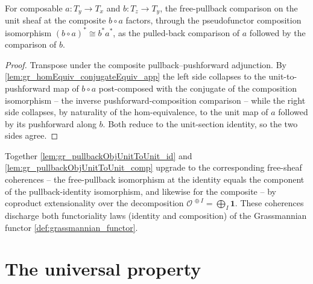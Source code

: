 \begin{lemma}\leanok
  \label{lem:gr_pullbackObjUnitToUnit_comp}
  For composable \(a : T_y \to T_x\) and \(b : T_z \to T_y\), the free-pullback comparison on
  the unit sheaf at the composite \(b \circ a\) factors, through the pseudofunctor composition
  isomorphism \((b\circ a)^{*}\cong b^{*}a^{*}\), as the pulled-back comparison of \(a\)
  followed by the comparison of \(b\).
\end{lemma}
\begin{proof}
  \leanok
  Transpose under the composite pullback--pushforward adjunction. By
  \cref{lem:gr_homEquiv_conjugateEquiv_app} the left side collapses to the unit-to-pushforward
  map of \(b\circ a\) post-composed with the conjugate of the composition isomorphism -- the
  inverse pushforward-composition comparison -- while the right side collapses, by naturality
  of the hom-equivalence, to the unit map of \(a\) followed by its pushforward along \(b\).
  Both reduce to the unit-section identity, so the two sides agree.
\end{proof}


Together \cref{lem:gr_pullbackObjUnitToUnit_id} and \cref{lem:gr_pullbackObjUnitToUnit_comp}
upgrade to the corresponding free-sheaf coherences -- the free-pullback isomorphism at the
identity equals the component of the pullback-identity isomorphism, and likewise for the
composite -- by coproduct extensionality over the decomposition
\(\mathcal{O}^{\,\oplus I} = \bigoplus_I \mathbf 1\). These coherences discharge both
functoriality laws (identity and composition) of the Grassmannian
functor \cref{def:grassmannian_functor}.


\section{The universal property}
\label{sec:grquot_universal}

